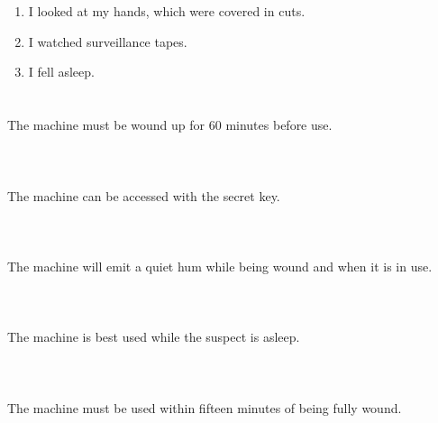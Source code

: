 \documentclass{article}
\begin{document}
    \newpage
    
    \section{}
    
    \begin{enumerate}
    
    \item I looked at my hands, which were covered in cuts.\\
    
    \item I watched surveillance tapes.\\
    
    \item I fell asleep.\\
    
    \end{enumerate}
     
    \newpage
    
    \section{}
    The machine must be wound up for 60 minutes before use.\\\\ 
    \newpage
    
    \section{}
    The machine can be accessed with the secret key.\\\\ 
    \newpage
    
    \section{}
    The machine will emit a quiet hum while being wound and when it is in use.\\\\ 
    \newpage
    
    \section{}
    The machine is best used while the suspect is asleep.\\\\ 
    \newpage
    
    \section{}
    The machine must be used within fifteen minutes of being fully wound.\\\\ 
    \newpage
    
\end{document}
